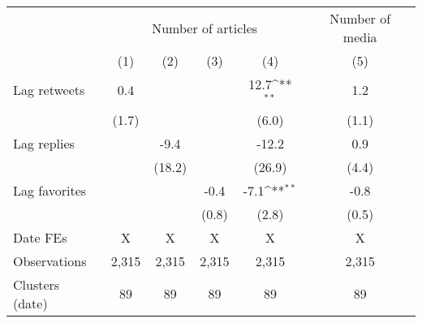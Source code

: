 {
\def\sym#1{\ifmmode^{#1}\else\(^{#1}\)\fi}
\begin{tabular}{l*{5}{c}}
\hline\hline
                    &\multicolumn{4}{c}{Number of articles}                                                 &\multicolumn{1}{c}{Number of media}\\\cmidrule(lr){2-5}\cmidrule(lr){6-6}
                    &\multicolumn{1}{c}{(1)}         &\multicolumn{1}{c}{(2)}         &\multicolumn{1}{c}{(3)}         &\multicolumn{1}{c}{(4)}         &\multicolumn{1}{c}{(5)}         \\
\hline
Lag retweets        &         0.4         &                     &                     &        12.7\sym{**} &         1.2         \\
                    &       (1.7)         &                     &                     &       (6.0)         &       (1.1)         \\
Lag replies         &                     &        -9.4         &                     &       -12.2         &         0.9         \\
                    &                     &      (18.2)         &                     &      (26.9)         &       (4.4)         \\
Lag favorites       &                     &                     &        -0.4         &        -7.1\sym{**} &        -0.8         \\
                    &                     &                     &       (0.8)         &       (2.8)         &       (0.5)         \\
\hline
Date FEs            &           X         &           X         &           X         &           X         &           X         \\
Observations        &       2,315         &       2,315         &       2,315         &       2,315         &       2,315         \\
Clusters (date)     &          89         &          89         &          89         &          89         &          89         \\
\hline\hline
\end{tabular}
}
